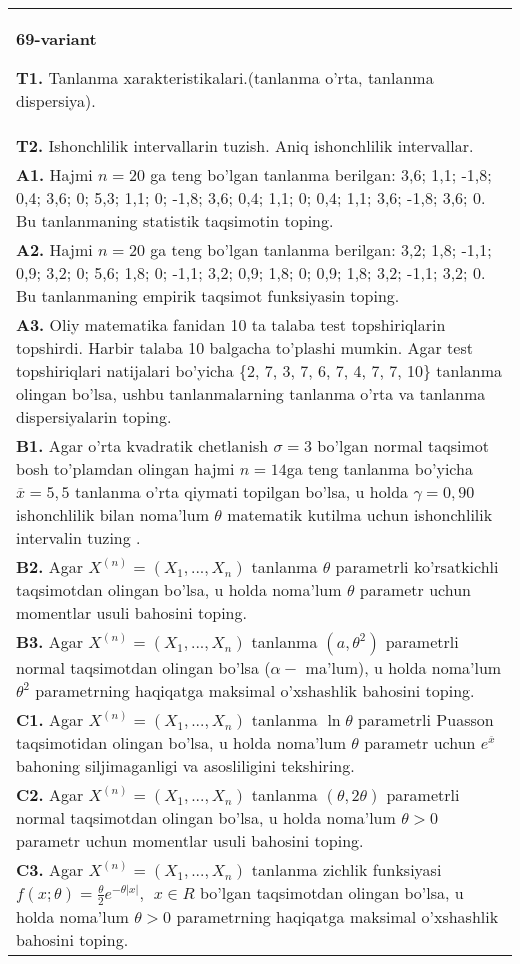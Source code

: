 \documentclass{article}
\begin{document}
\begin{tabular}{m{17cm}}
\textbf{69-variant}
\newline

\textbf{T1.} 
Tanlanma xarakteristikalari.(tanlanma o'rta, tanlanma dispersiya).
\\
\textbf{T2.} 
Ishonchlilik intervallarin tuzish. Aniq ishonchlilik intervallar.
\\
\textbf{A1.} 
Hajmi \(n = 20\) ga teng bo'lgan tanlanma berilgan: 3,6; 1,1; -1,8; 0,4; 3,6; 0; 5,3; 1,1; 0; -1,8; 3,6; 0,4; 1,1; 0; 0,4; 1,1; 3,6; -1,8; 3,6; 0. Bu tanlanmaning statistik taqsimotin toping.
\\
\textbf{A2.} 
Hajmi \(n = 20\) ga teng bo'lgan tanlanma berilgan: 3,2; 1,8; -1,1; 0,9; 3,2; 0; 5,6; 1,8; 0; -1,1; 3,2; 0,9; 1,8; 0; 0,9; 1,8; 3,2; -1,1; 3,2; 0. Bu tanlanmaning empirik taqsimot funksiyasin toping.
\\
\textbf{A3.} 
Oliy matematika fanidan 10 ta talaba test topshiriqlarin topshirdi. Harbir talaba 10 balgacha to'plashi mumkin. Agar test topshiriqlari natijalari bo'yicha \{2, 7, 3, 7, 6, 7, 4, 7, 7, 10\} tanlanma olingan bo'lsa, ushbu tanlanmalarning tanlanma o'rta va tanlanma dispersiyalarin toping.
\\
\textbf{B1.} 
Agar o'rta kvadratik chetlanish \(\sigma = 3\) bo'lgan normal taqsimot bosh to'plamdan olingan hajmi \(n = 14\)ga teng tanlanma bo'yicha \(\overline{x} = 5,5\) tanlanma o'rta qiymati topilgan bo'lsa, u holda \(\gamma = 0,90\) ishonchlilik bilan noma'lum \(\theta\) matematik kutilma uchun ishonchlilik intervalin tuzing .
\\
\textbf{B2.} 
Agar \(X^{(n)} = \left( X_{1},...,X_{n} \right)\) tanlanma \(\theta\) parametrli ko'rsatkichli taqsimotdan olingan bo'lsa, u holda noma'lum \(\theta\) parametr uchun momentlar usuli bahosini toping.
\\
\textbf{B3.} 
Agar \(X^{(n)} = \left( X_{1},...,X_{n} \right)\) tanlanma \(\left( a,\theta^{2} \right)\) parametrli normal taqsimotdan olingan bo'lsa (\(\alpha -\) ma'lum), u holda noma'lum \(\theta^{2}\) parametrning haqiqatga maksimal o'xshashlik bahosini toping.
\\
\textbf{C1.} 
Agar \(X^{(n)} = \left( X_{1},...,X_{n} \right)\) tanlanma \(\ln\theta\) parametrli Puasson taqsimotidan olingan bo'lsa, u holda noma'lum \(\theta\) parametr uchun \(e^{\overline{x}}\) bahoning siljimaganligi va asosliligini tekshiring.
\\
\textbf{C2.} 
Agar \(X^{(n)} = \left( X_{1},...,X_{n} \right)\) tanlanma \((\theta,2\theta)\) parametrli normal taqsimotdan olingan bo'lsa, u holda noma'lum \(\theta > 0\) parametr uchun momentlar usuli bahosini toping.
\\
\textbf{C3.} 
Agar \(X^{(n)} = \left( X_{1},...,X_{n} \right)\) tanlanma zichlik funksiyasi\(f(x;\theta) = \frac{\theta}{2}e^{- \theta|x|},\ \ x \in R\) bo'lgan taqsimotdan olingan bo'lsa, u holda noma'lum \(\theta > 0\) parametrning haqiqatga maksimal o'xshashlik bahosini toping.
\\

\end{tabular}
\vspace{1cm}
\end{document}
